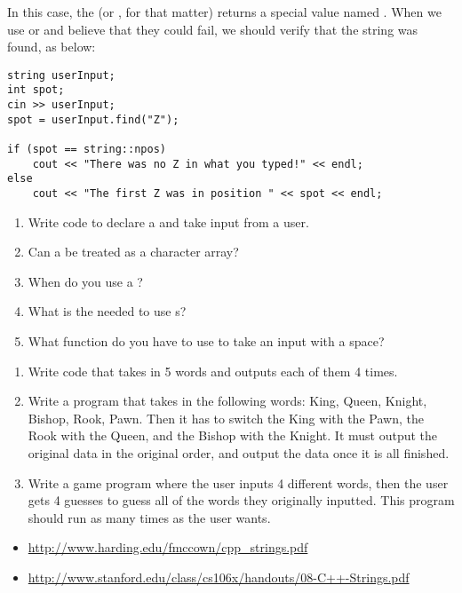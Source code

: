 \noindent In this case, the  (or , for that matter) returns a special value named .
When we use  or  and believe that they could fail, we should verify that the string was found, as below:

\noindent\begin{minipage}{\textwidth}\begin{lstlisting}
string userInput;
int spot;
cin >> userInput;
spot = userInput.find("Z");

if (spot == string::npos)
	cout << "There was no Z in what you typed!" << endl;
else
	cout << "The first Z was in position " << spot << endl;
\end{lstlisting}\end{minipage}
\begin{enumerate}
\item Write code to declare a  and take input from a user.
\item Can a  be treated as a character array?
\item When do you use a ?
\item What is the  needed to use s?
\item What function do you have to use to take an input with a space?
\end{enumerate}

\begin{enumerate}
\item Write code that takes in 5 words and outputs each of them 4 times.

\item Write a program that takes in the following words: King, Queen, Knight, Bishop, Rook, Pawn. 
Then it has to switch the King with the Pawn, the Rook with the Queen, and the Bishop with the Knight.
It must output the original data in the original order, and output the data once it is all finished.

\item Write a game program where the user inputs 4 different words, then the user gets 4 guesses to guess all of the words they originally inputted.
This program should run as many times as the user wants.
\end{enumerate}



\begin{itemize}
\item \url{http://www.harding.edu/fmccown/cpp_strings.pdf}
\item \url{http://www.stanford.edu/class/cs106x/handouts/08-C++-Strings.pdf}
\end{itemize}

